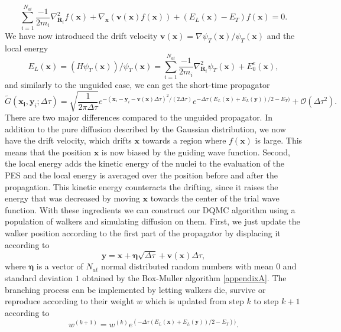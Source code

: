 \documentclass [12pt]{report}
\begin{document}
\begin{equation} \label{eq:2.8}
\sum_{i=1}^{N_{at}} \frac{-1}{2m_i} \nabla^2_{\bm{R}_i} f(\bm{x}) + \nabla_{\bm{x}} (\bm{v}(\bm{x}) f(\bm{x})) + (E_L(\bm{x}) - E_T)f(\bm{x}) = 0.
\end{equation}
We have now introduced the drift velocity $\bm{v}(\bm{x}) = \nabla \psi_T(\bm{x})/ \psi_T(\bm{x})$ and the local energy 
\begin{equation}\label{el}
E_L(\bm{x}) = (H\psi_T(\bm{x}))/\psi_T(\bm{x}) = \sum_{i=1}^{N_{at}} \frac{-1}{2m_i} \nabla^2_{\bm{R}_i} \psi_T(\bm{x}) + E_0^e(\bm{x}),
\end{equation}
and similarly to the unguided case, we can get the short-time propagator
\begin{equation} \label{eq:2.9}
\tilde{G}(\bm{x_i},\bm{y}_i;\Delta \tau) = \sqrt{\frac{1}{2 \pi \Delta \tau}} e^{-(\bm{x}_i-\bm{y}_i-\bm{v}(\bm{x})\Delta \tau)^2 /(2 \Delta \tau)} e^{-\Delta \tau (E_L(\bm{x})+E_L(\bm{y}))/2 - E_T)} + \mathcal{O}(\Delta \tau^2).
\end{equation}
There are two major differences compared to the unguided propagator. In addition to the pure diffusion described by the Gaussian distribution, we now have the drift velocity, which drifts $\bm{x}$ towards a region where $f(\bm{x})$ is large. This means that the position $\bm{x}$ is now biased by the guiding wave function. Second, the local energy adds the kinetic energy of the nuclei to the evaluation of the PES and the local energy is averaged over the position before and after the propagation. This kinetic energy counteracts the drifting, since it raises the energy that was decreased by moving $\bm{x}$ towards the center of the trial wave function.
With these ingredients we can construct our DQMC algorithm using a population of walkers and simulating diffusion on them. First, we just update the walker position according to the first part of the propagator by displacing it according to
\begin{equation}\label{eq:2.10}
\bm{y} = \bm{x} + \bm{\eta}\sqrt{\Delta \tau} + \bm{v}(\bm{x})\Delta \tau,
\end{equation}
where $\bm{\eta}$ is a vector of $N_{at}$ normal distributed random numbers with mean $0$ and standard deviation $1$ obtained by the Box-Muller algorithm \ref{appendixA}.
The branching process can be implemented by letting walkers die, survive or reproduce according to their weight $w$ which is updated from step $k$ to step $k+1$ according to 
\begin{equation}\label{eq:2.11} 
w^{(k+1)} = w^{(k)} e^{(-\Delta \tau (E_L(\bm{x}) + E_L(\bm{y}))/2 - E_T))}.
\end{equation}
\end{document}
